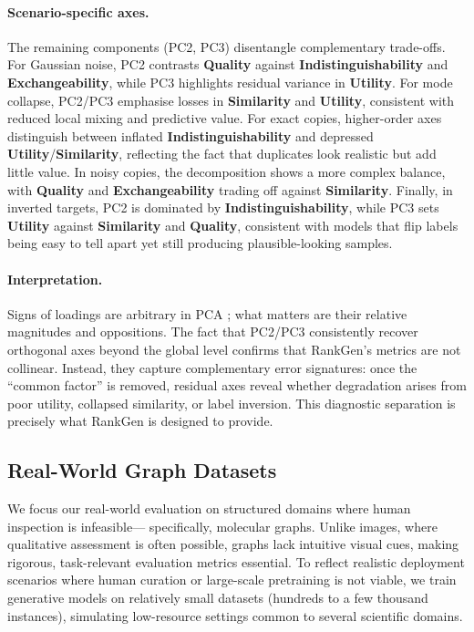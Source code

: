 \paragraph{Scenario-specific axes.}
The remaining components (PC2, PC3) disentangle complementary trade-offs. For Gaussian noise, PC2 contrasts \textbf{Quality} against \textbf{Indistinguishability} and \textbf{Exchangeability}, while PC3 highlights residual variance in \textbf{Utility}. For mode collapse, PC2/PC3 emphasise losses in \textbf{Similarity} and \textbf{Utility}, consistent with reduced local mixing and predictive value. For exact copies, higher-order axes distinguish between inflated \textbf{Indistinguishability} and depressed \textbf{Utility}/\textbf{Similarity}, reflecting the fact that duplicates look realistic but add little value. In noisy copies, the decomposition shows a more complex balance, with \textbf{Quality} and \textbf{Exchangeability} trading off against \textbf{Similarity}. Finally, in inverted targets, PC2 is dominated by \textbf{Indistinguishability}, while PC3 sets \textbf{Utility} against \textbf{Similarity} and \textbf{Quality}, consistent with models that flip labels being easy to tell apart yet still producing plausible-looking samples.

\paragraph{Interpretation.}
Signs of loadings are arbitrary in PCA \citep{abdi2010pca,lever2017pca}; what matters are their relative magnitudes and oppositions. The fact that PC2/PC3 consistently recover orthogonal axes beyond the global level confirms that RankGen’s metrics are not collinear. Instead, they capture complementary error signatures: once the “common factor” is removed, residual axes reveal whether degradation arises from poor utility, collapsed similarity, or label inversion. This diagnostic separation is precisely what RankGen is designed to provide.



\subsection{Real-World Graph Datasets}
\label{sec:real-world-graphs}
We focus our real-world evaluation on structured domains where human inspection is infeasible—
specifically, molecular graphs. Unlike images, where qualitative assessment is often possible, graphs lack intuitive visual cues, making rigorous, task-relevant evaluation metrics essential. To reflect realistic deployment scenarios where human curation or large-scale pretraining is not viable, we train generative models on relatively small datasets (hundreds to a few thousand instances), simulating low-resource settings common to several scientific domains.

